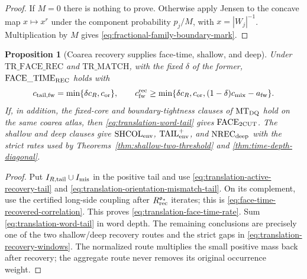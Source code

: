 \documentclass[11pt]{article}
\newtheorem{proposition}[theorem]{Proposition}
\begin{document}
\begin{proof}
If $M=0$ there is nothing to prove.  Otherwise apply Jensen to the concave
map $x\mapsto x^r$ under the component probability $p_j/M$, with
$x=|W_j|^{-1}$.  Multiplication by $M$ gives
\eqref{eq:fractional-family-boundary-mark}.
\end{proof}

\begin{proposition}[Coarea recovery supplies face-time, shallow, and deep]
\label{prop:translation-recovery-closes-three}
Under $\mathrm{TR\_FACE\_REC}$ and $\mathrm{TR\_MATCH}$, with the fixed
$\delta$ of the former,
$\mathrm{FACE\_TIME}_{\rm REC}$ holds with
\begin{equation}
\label{eq:translation-face-time-rate}
 c_{\rm tail,fw}=\min\{\delta c_R,c_{\rm or}\},\qquad
 c_{\rm fw}^{\rm rec}\ge
 \min\{\delta c_R,c_{\rm or},
             (1-\delta)c_{\rm mix}-a_{\rm fw}\}.
\end{equation}
If, in addition, the fixed-core and boundary-tightness clauses of
$\mathrm{MT}_{\rm DQ}$ hold on the same coarea atlas, then
\eqref{eq:translation-word-tail} gives $\mathrm{FACE}_{\rm 2CUT}$.
The shallow and deep clauses give
$\mathrm{SHCOL}_{\rm env}$,
$\mathrm{TAIL}_{\rm env}^{+}$, and $\mathrm{NREC}_{\rm deep}$ with the
strict rates used by Theorems~\ref{thm:shallow-two-threshold} and
\ref{thm:time-depth-diagonal}.
\end{proposition}

\begin{proof}
Put $I_{R,\rm tail}\cup I_{\rm mis}$ in the positive tail and use
\eqref{eq:translation-active-recovery-tail} and
\eqref{eq:translation-orientation-mismatch-tail}.  On its complement, use
the certified long-side coupling after
$R_{\rm rec}^{\mathfrak o_*}$ iterates;
this is
\eqref{eq:face-time-recovered-correlation}.  This proves
\eqref{eq:translation-face-time-rate}.  Sum
\eqref{eq:translation-word-tail} in word depth.  The remaining conclusions
are precisely one of the two shallow/deep recovery routes and the strict
gaps in \eqref{eq:translation-recovery-windows}.  The normalized route
multiplies the small positive mass back after recovery; the aggregate route
never removes its original occurrence weight.
\end{proof}
\end{document}

